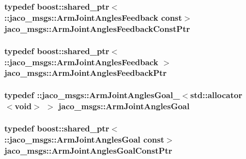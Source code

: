 \subsubsection[{\texorpdfstring{Arm\+Joint\+Angles\+Feedback\+Const\+Ptr}{ArmJointAnglesFeedbackConstPtr}}]{\setlength{\rightskip}{0pt plus 5cm}typedef boost\+::shared\+\_\+ptr$<$ \+::{\bf jaco\+\_\+msgs\+::\+Arm\+Joint\+Angles\+Feedback} const$>$ {\bf jaco\+\_\+msgs\+::\+Arm\+Joint\+Angles\+Feedback\+Const\+Ptr}}\hypertarget{namespacejaco__msgs_afc8d8b7d636be616ec74d75c13b205ce}{}\label{namespacejaco__msgs_afc8d8b7d636be616ec74d75c13b205ce}
\subsubsection[{\texorpdfstring{Arm\+Joint\+Angles\+Feedback\+Ptr}{ArmJointAnglesFeedbackPtr}}]{\setlength{\rightskip}{0pt plus 5cm}typedef boost\+::shared\+\_\+ptr$<$ \+::{\bf jaco\+\_\+msgs\+::\+Arm\+Joint\+Angles\+Feedback} $>$ {\bf jaco\+\_\+msgs\+::\+Arm\+Joint\+Angles\+Feedback\+Ptr}}\hypertarget{namespacejaco__msgs_a7739c7db7b7ff6bab624e54d08c5d7fb}{}\label{namespacejaco__msgs_a7739c7db7b7ff6bab624e54d08c5d7fb}
\subsubsection[{\texorpdfstring{Arm\+Joint\+Angles\+Goal}{ArmJointAnglesGoal}}]{\setlength{\rightskip}{0pt plus 5cm}typedef \+::{\bf jaco\+\_\+msgs\+::\+Arm\+Joint\+Angles\+Goal\+\_\+}$<$std\+::allocator$<$void$>$ $>$ {\bf jaco\+\_\+msgs\+::\+Arm\+Joint\+Angles\+Goal}}\hypertarget{namespacejaco__msgs_a5ae3531b112ac4b78145e9ab10e9a8fa}{}\label{namespacejaco__msgs_a5ae3531b112ac4b78145e9ab10e9a8fa}
\subsubsection[{\texorpdfstring{Arm\+Joint\+Angles\+Goal\+Const\+Ptr}{ArmJointAnglesGoalConstPtr}}]{\setlength{\rightskip}{0pt plus 5cm}typedef boost\+::shared\+\_\+ptr$<$ \+::{\bf jaco\+\_\+msgs\+::\+Arm\+Joint\+Angles\+Goal} const$>$ {\bf jaco\+\_\+msgs\+::\+Arm\+Joint\+Angles\+Goal\+Const\+Ptr}}\hypertarget{namespacejaco__msgs_a9056d2fb29e6973f6db43a60138ffc7c}{}\label{namespacejaco__msgs_a9056d2fb29e6973f6db43a60138ffc7c}
